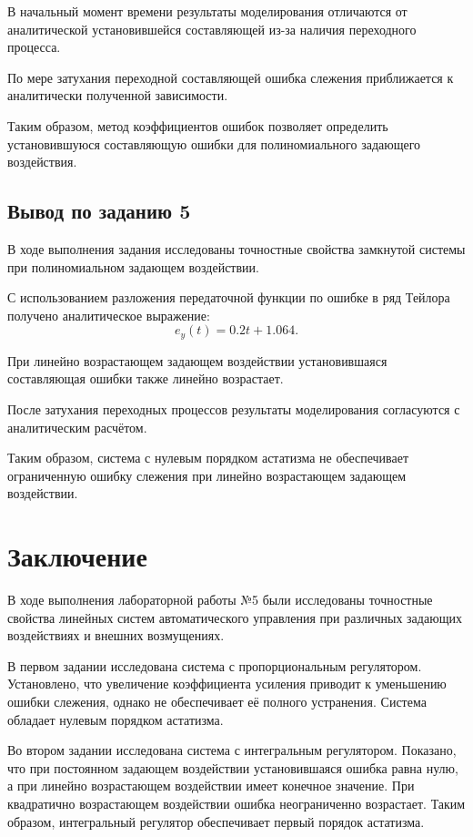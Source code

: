 \documentclass[12pt, a4paper]{article}
\begin{document}
В начальный момент времени результаты
моделирования отличаются от аналитической
установившейся составляющей из-за
наличия переходного процесса.

По мере затухания переходной составляющей
ошибка слежения приближается к
аналитически полученной зависимости.

Таким образом, метод коэффициентов ошибок
позволяет определить установившуюся
составляющую ошибки для полиномиального
задающего воздействия.


\subsection{Вывод по заданию 5}

В ходе выполнения задания исследованы
точностные свойства замкнутой системы
при полиномиальном задающем воздействии.

С использованием разложения передаточной
функции по ошибке в ряд Тейлора
получено аналитическое выражение:
\[
    e_y(t)=0.2t+1.064.
\]

При линейно возрастающем задающем
воздействии установившаяся составляющая
ошибки также линейно возрастает.

После затухания переходных процессов
результаты моделирования согласуются
с аналитическим расчётом.

Таким образом, система с нулевым порядком
астатизма не обеспечивает ограниченную
ошибку слежения при линейно
возрастающем задающем воздействии.





\newpage
\section{Заключение}

В ходе выполнения лабораторной работы №5 были
исследованы точностные свойства линейных
систем автоматического управления при
различных задающих воздействиях и внешних
возмущениях.

В первом задании исследована система
с пропорциональным регулятором.
Установлено, что увеличение коэффициента
усиления приводит к уменьшению ошибки
слежения, однако не обеспечивает
её полного устранения.
Система обладает нулевым порядком
астатизма.

Во втором задании исследована система
с интегральным регулятором.
Показано, что при постоянном задающем
воздействии установившаяся ошибка
равна нулю, а при линейно возрастающем
воздействии имеет конечное значение.
При квадратично возрастающем воздействии
ошибка неограниченно возрастает.
Таким образом, интегральный регулятор
обеспечивает первый порядок астатизма.
\end{document}
